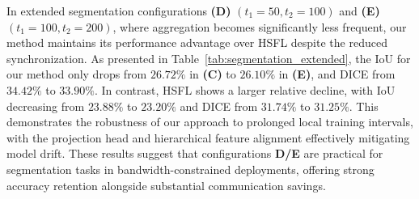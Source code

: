 \documentclass[letterpaper]{article} %
\begin{document}
    In extended segmentation configurations \textbf{(D)} $(t_1=50, t_2=100)$ and \textbf{(E)} $(t_1=100, t_2=200)$, where aggregation becomes significantly less frequent, our method maintains its performance advantage over HSFL despite the reduced synchronization. As presented in Table~\ref{tab:segmentation_extended}, the IoU for our method only drops from $26.72\%$ in \textbf{(C)} to $26.10\%$ in \textbf{(E)}, and DICE from $34.42\%$ to $33.90\%$. In contrast, HSFL shows a larger relative decline, with IoU decreasing from $23.88\%$ to $23.20\%$ and DICE from $31.74\%$ to $31.25\%$. This demonstrates the robustness of our approach to prolonged local training intervals, with the projection head and hierarchical feature alignment effectively mitigating model drift. These results suggest that configurations \textbf{D/E} are practical for segmentation tasks in bandwidth-constrained deployments, offering strong accuracy retention alongside substantial communication savings.


\end{document}
